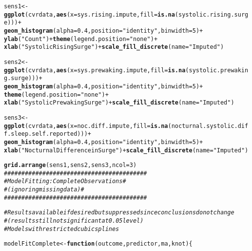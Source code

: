 \documentclass[10pt]{article}\usepackage[]{graphicx}\usepackage[]{color}
\makeatletter
\newcommand{\hlnum}[1]{\textcolor[rgb]{0.686,0.059,0.569}{#1}}%
\newcommand{\hlstr}[1]{\textcolor[rgb]{0.192,0.494,0.8}{#1}}%
\newcommand{\hlcom}[1]{\textcolor[rgb]{0.678,0.584,0.686}{\textit{#1}}}%
\newcommand{\hlopt}[1]{\textcolor[rgb]{0,0,0}{#1}}%
\newcommand{\hlstd}[1]{\textcolor[rgb]{0.345,0.345,0.345}{#1}}%
\newcommand{\hlkwa}[1]{\textcolor[rgb]{0.161,0.373,0.58}{\textbf{#1}}}%
\newcommand{\hlkwb}[1]{\textcolor[rgb]{0.69,0.353,0.396}{#1}}%
\newcommand{\hlkwc}[1]{\textcolor[rgb]{0.333,0.667,0.333}{#1}}%
\newcommand{\hlkwd}[1]{\textcolor[rgb]{0.737,0.353,0.396}{\textbf{#1}}}%
\newenvironment{kframe}{%
 \def\at@end@of@kframe{}%
 \ifinner\ifhmode%
  \def\at@end@of@kframe{\end{minipage}}%
  \begin{minipage}{\columnwidth}%
 \fi\fi%
 \def\FrameCommand##1{\hskip\@totalleftmargin \hskip-\fboxsep
 \colorbox{shadecolor}{##1}\hskip-\fboxsep
     \hskip-\linewidth \hskip-\@totalleftmargin \hskip\columnwidth}%
 \MakeFramed {\advance\hsize-\width
   \@totalleftmargin\z@ \linewidth\hsize
   \@setminipage}}%
 {\par\unskip\endMakeFramed%
 \at@end@of@kframe}
\newenvironment{knitrout}{}{} %
\makeatother
\begin{document}
\begin{knitrout}
\begin{kframe}
\begin{alltt}
\hlstd{sens1} \hlkwb{<-} \hlkwd{ggplot}\hlstd{(cvrdata,} \hlkwd{aes}\hlstd{(}\hlkwc{x}\hlstd{=sys.rising.impute,} \hlkwc{fill} \hlstd{=} \hlkwd{is.na}\hlstd{(systolic.rising.surge)))} \hlopt{+}
  \hlkwd{geom_histogram}\hlstd{(}\hlkwc{alpha}\hlstd{=}\hlnum{0.4}\hlstd{,} \hlkwc{position}\hlstd{=}\hlstr{"identity"}\hlstd{,} \hlkwc{binwidth} \hlstd{=} \hlnum{5}\hlstd{)} \hlopt{+}
  \hlkwd{ylab}\hlstd{(}\hlstr{"Count"}\hlstd{)} \hlopt{+} \hlkwd{theme}\hlstd{(}\hlkwc{legend.position} \hlstd{=} \hlstr{"none"}\hlstd{)} \hlopt{+}
  \hlkwd{xlab}\hlstd{(}\hlstr{"Systolic Rising Surge"}\hlstd{)} \hlopt{+} \hlkwd{scale_fill_discrete}\hlstd{(}\hlkwc{name} \hlstd{=} \hlstr{"Imputed"}\hlstd{)}

\hlstd{sens2} \hlkwb{<-} \hlkwd{ggplot}\hlstd{(cvrdata,} \hlkwd{aes}\hlstd{(}\hlkwc{x}\hlstd{=sys.prewaking.impute,} \hlkwc{fill} \hlstd{=} \hlkwd{is.na}\hlstd{(systolic.prewaking.surge)))} \hlopt{+}
  \hlkwd{geom_histogram}\hlstd{(}\hlkwc{alpha}\hlstd{=}\hlnum{0.4}\hlstd{,} \hlkwc{position}\hlstd{=}\hlstr{"identity"}\hlstd{,} \hlkwc{binwidth} \hlstd{=} \hlnum{5}\hlstd{)} \hlopt{+}
  \hlkwd{theme}\hlstd{(}\hlkwc{legend.position} \hlstd{=} \hlstr{"none"}\hlstd{)} \hlopt{+}
  \hlkwd{xlab}\hlstd{(}\hlstr{"Systolic Prewaking Surge"}\hlstd{)} \hlopt{+} \hlkwd{scale_fill_discrete}\hlstd{(}\hlkwc{name} \hlstd{=} \hlstr{"Imputed"}\hlstd{)}

\hlstd{sens3} \hlkwb{<-} \hlkwd{ggplot}\hlstd{(cvrdata,} \hlkwd{aes}\hlstd{(}\hlkwc{x}\hlstd{=noc.diff.impute,} \hlkwc{fill} \hlstd{=} \hlkwd{is.na}\hlstd{(nocturnal.systolic.diff.sleep.self.reported)))} \hlopt{+}
  \hlkwd{geom_histogram}\hlstd{(}\hlkwc{alpha}\hlstd{=}\hlnum{0.4}\hlstd{,} \hlkwc{position}\hlstd{=}\hlstr{"identity"}\hlstd{,} \hlkwc{binwidth} \hlstd{=} \hlnum{5}\hlstd{)} \hlopt{+}
  \hlkwd{xlab}\hlstd{(}\hlstr{"Nocturnal Difference in Surge"}\hlstd{)} \hlopt{+} \hlkwd{scale_fill_discrete}\hlstd{(}\hlkwc{name} \hlstd{=} \hlstr{"Imputed"}\hlstd{)}

\hlkwd{grid.arrange}\hlstd{(sens1, sens2, sens3,} \hlkwc{ncol} \hlstd{=} \hlnum{3}\hlstd{)}
\hlcom{#########################################}
\hlcom{#  Model Fitting: Complete Observations #}
\hlcom{#  (ignoring missing data)              #}
\hlcom{#########################################}

\hlcom{#Results available if desired but suppressed since conclusions do not change}
\hlcom{#  (results still not significant at 0.05 level)}
\hlcom{#Models with restricted cubic splines}

\hlstd{modelFitComplete} \hlkwb{<-} \hlkwa{function}\hlstd{(}\hlkwc{outcome}\hlstd{,} \hlkwc{predictor}\hlstd{,} \hlkwc{ma}\hlstd{,} \hlkwc{knot}\hlstd{)\{}


\end{alltt}
\end{kframe}
\end{knitrout}
\end{document}
